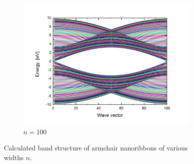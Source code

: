 \begin{figure}[hb!]
\begin{subfigure}{.5\textwidth}
  \includegraphics[width=\linewidth]{img/ac_ribbon_100}
  \caption{$n=100$}
  \label{fig:ac100}
\end{subfigure}
\caption{Calculated band structure of armchair nanoribbons of various widths $n$. \label{fig:ac_ribbons}}
\end{figure}

